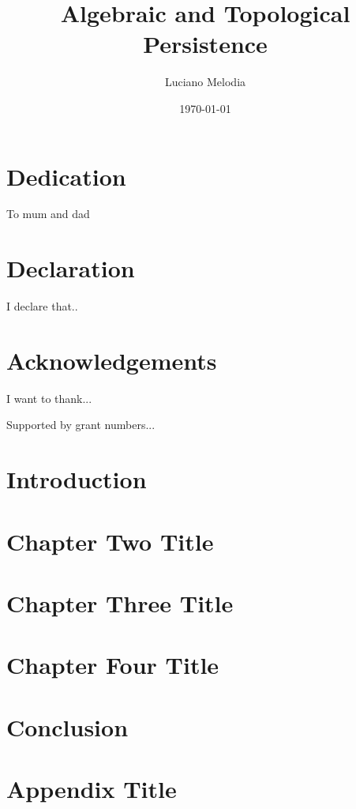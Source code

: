 \documentclass[b5paper, 11pt, twoside]{report}
\title{Algebraic and Topological Persistence}
\author{Luciano Melodia}
\date{\today}
\begin{document}



\chapter*{Dedication}

To mum and dad

\chapter*{Declaration}

I declare that..

\chapter*{Acknowledgements}

I want to thank...

Supported by grant numbers...

\newpage
\tableofcontents

\newpage
\listoffigures
\listoftables

\singlespacing
\chapter{Introduction}


\chapter{Chapter Two Title}


\chapter{Chapter Three Title}


\chapter{Chapter Four Title}


\chapter{Conclusion}


\appendix
\chapter{Appendix Title}


\singlespacing
\printbibliography
\end{document}
